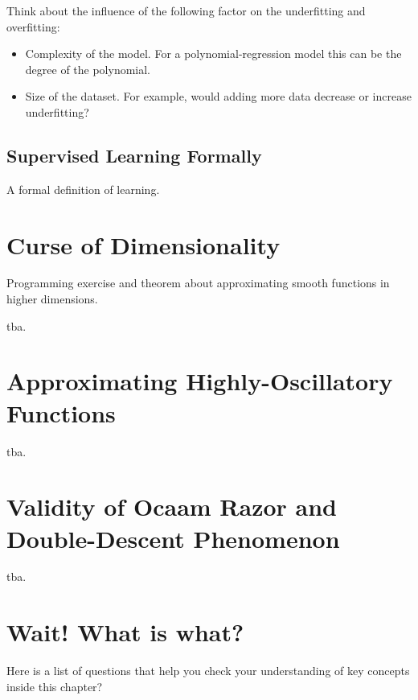 Think about the influence of the following factor on the underfitting and
overfitting:
\begin{itemize}
    \item Complexity of the model. For a polynomial-regression model this can be
    the degree of the polynomial. 
    \item Size of the dataset. For example, would adding more data decrease or
    increase underfitting?
\end{itemize}

\subsection{Supervised Learning Formally}
A formal definition of learning.

\section{Curse of Dimensionality}
Programming exercise and theorem about approximating smooth functions in higher
dimensions. 
\begin{boxedexample}[Classification] \complementary{\theexample}
    \label{ex:CoD}
tba.
\end{boxedexample}

\section{Approximating Highly-Oscillatory Functions}
\begin{boxedexample}[Classification] \complementary{\theexample}
    \label{ex:oscillatory}
    tba.
\end{boxedexample}

\section{Validity of Ocaam Razor and Double-Descent Phenomenon}
\begin{boxedexample} \complementary{\theexample}
    \label{ex:double_descent}
    tba.
\end{boxedexample}

\section*{Wait! What is what?}
Here is a list of questions that help you check your understanding of key
concepts inside this chapter?

